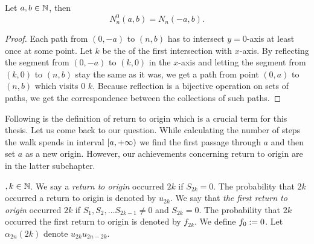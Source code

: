 \begin{thm}\label{thm-reflection_principle}
 Let $a,b \in \mathbb{N}$, then
 \[
    N_n^0 \left( a,b \right) =N_n \left( -a,b \right).
  \]
\end{thm}
\begin{proof}
 Each path from $ \left( 0,-a \right) $ to $ \left( n,b \right) $ has to intersect $y=0$-axis at least once at some point.
 Let $k$ be the \Time of the first intersection with $x$-axis. By reflecting the segment from $\left( 0,-a \right)$ to $\left( k,0 \right)$ in the $x$-axis and letting the segment from $\left(k,0\right)$ to $\left(n,b\right)$ stay the same as it was,
 we get a path from point $\left( 0,a \right)$ to $ \left(n,b\right)$ which visits $0$ \intime $k$.
 Because reflection is a bijective operation on sets of paths, we get the correspondence between the collections of such paths.
\end{proof}

\begin{rem}
  Following is the definition of return to origin which is a crucial term for this thesis.
  Let us come back to our question.
  While calculating the number of steps the walk spends in interval $[a,{+\infty})$ we find the first passage through $a$ and then set $a$ as a new origin. However, our achievements concerning return to origin are in the latter subchapter.
\end{rem}

\begin{defn}\label{defn-return_origin}
 \Lrw$, k \in \mathbb{N}$. We say a \emph{return to origin} occurred \intime $2k$ if $S_{2k}=0$. The probability that \intime $2k$ occurred a return to origin is denoted by $u_{2k}$.
 We say that \emph{the first return to origin} occurred \intime $2k$ if $S_1, S_2, \ldots S_{2k-1}\neq 0$ and $S_{2k}=0$.
 The probability that \intime $2k$ occurred the first return to origin is denoted by $f_{2k}$. We define $f_0 := 0$.
 Let $\alpha_{2n} \left( 2k \right) $ denote $u_{2k}u_{2n-2k}.$
\end{defn}

